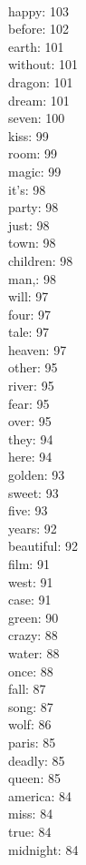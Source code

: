\begin{multicols}{6}
  \\ happy: 103
  \\ before: 102
  \\ earth: 101
  \\ without: 101
  \\ dragon: 101
  \\ dream: 101
  \\ seven: 100
  \\ kiss: 99
  \\ room: 99
  \\ magic: 99
  \\ it's: 98
  \\ party: 98
  \\ just: 98
  \\ town: 98
  \\ children: 98
  \\ man,: 98
  \\ will: 97
  \\ four: 97
  \\ tale: 97
  \\ heaven: 97
  \\ other: 95
  \\ river: 95
  \\ fear: 95
  \\ over: 95
  \\ they: 94
  \\ here: 94
  \\ golden: 93
  \\ sweet: 93
  \\ five: 93
  \\ years: 92
  \\ beautiful: 92
  \\ film: 91
  \\ west: 91
  \\ case: 91
  \\ green: 90
  \\ crazy: 88
  \\ water: 88
  \\ once: 88
  \\ fall: 87
  \\ song: 87
  \\ wolf: 86
  \\ paris: 85
  \\ deadly: 85
  \\ queen: 85
  \\ america: 84
  \\ miss: 84
  \\ true: 84
  \\ midnight: 84

\end{multicols}
